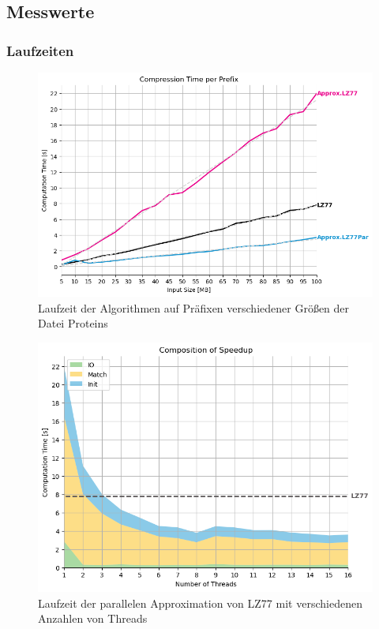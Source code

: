 \subsection{Messwerte}

\subsubsection{Laufzeiten}
\begin{figure}
    \centering
    \caption{Laufzeit der Algorithmen auf Präfixen verschiedener Größen der Datei Proteins}
    \includegraphics[scale=0.6]{Images/progressive.png}
    \end{figure}
    
\begin{figure}
    \centering
    \caption{Laufzeit der parallelen Approximation von LZ77 mit verschiedenen Anzahlen von Threads}
    \includegraphics[scale=0.6]{Images/progressive_speedup_stack.png}
\end{figure}

